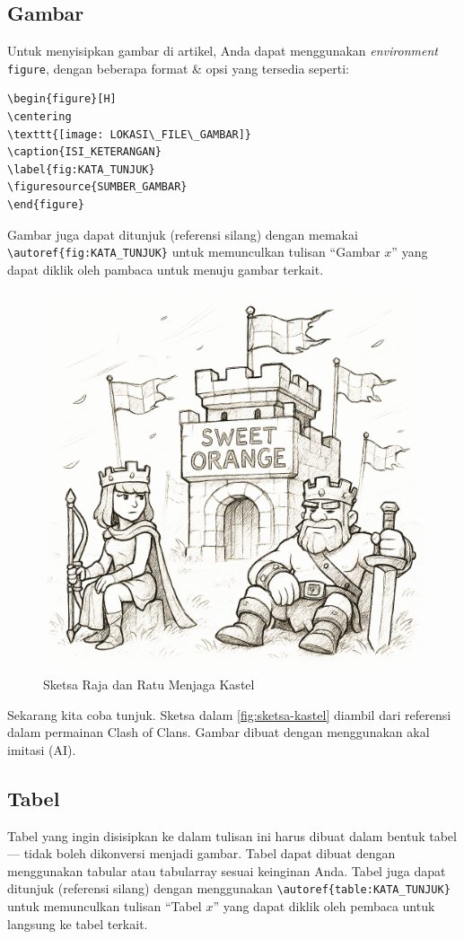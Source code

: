 \subsection{Gambar}
  
Untuk menyisipkan gambar di artikel, Anda dapat menggunakan \textit{environment} \texttt{figure}, dengan beberapa format \& opsi yang tersedia seperti:

\begin{lstlisting}
\begin{figure}[H]
\centering
\texttt{[image: LOKASI\_FILE\_GAMBAR]}
\caption{ISI_KETERANGAN}
\label{fig:KATA_TUNJUK}
\figuresource{SUMBER_GAMBAR}
\end{figure}
\end{lstlisting}

Gambar juga dapat ditunjuk (referensi silang) dengan memakai \verb|\autoref{fig:KATA_TUNJUK}| untuk memunculkan tulisan ``Gambar $x$'' yang dapat diklik oleh pambaca untuk menuju gambar terkait.

\begin{figure}[H]
    \centering
    \includegraphics[width=.5\linewidth]{image/Sweet Orange Castle.jpg}
    \caption{Sketsa Raja dan Ratu Menjaga Kastel}
    \label{fig:sketsa-kastel}
\end{figure}

Sekarang kita coba tunjuk. Sketsa dalam \autoref{fig:sketsa-kastel} diambil dari referensi dalam permainan Clash of Clans. Gambar dibuat dengan menggunakan akal imitasi (AI).

\subsection{Tabel}

Tabel yang ingin disisipkan ke dalam tulisan ini harus dibuat dalam bentuk tabel --- tidak boleh dikonversi menjadi gambar. Tabel dapat dibuat dengan menggunakan tabular atau tabularray sesuai keinginan Anda. Tabel juga dapat ditunjuk (referensi silang) dengan menggunakan \verb|\autoref{table:KATA_TUNJUK}| untuk memunculkan tulisan ``Tabel $x$'' yang dapat diklik oleh pembaca untuk langsung ke tabel terkait.

